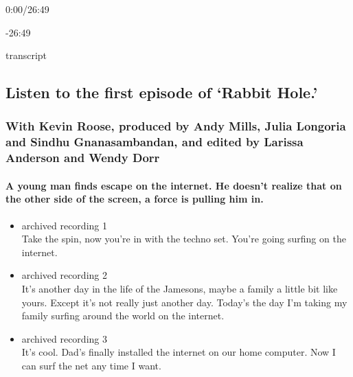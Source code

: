 0:00/26:49

-26:49

transcript

\hypertarget{listen-to-the-first-episode-of-rabbit-hole-1}{%
\subsection{Listen to the first episode of `Rabbit
Hole.'}\label{listen-to-the-first-episode-of-rabbit-hole-1}}

\hypertarget{with-kevin-roose-produced-by-andy-mills-julia-longoria-and-sindhu-gnanasambandan-and-edited-by-larissa-anderson-and-wendy-dorr}{%
\subsubsection{With Kevin Roose, produced by Andy Mills, Julia Longoria
and Sindhu Gnanasambandan, and edited by Larissa Anderson and Wendy
Dorr}\label{with-kevin-roose-produced-by-andy-mills-julia-longoria-and-sindhu-gnanasambandan-and-edited-by-larissa-anderson-and-wendy-dorr}}

\hypertarget{a-young-man-finds-escape-on-the-internet-he-doesnt-realize-that-on-the-other-side-of-the-screen-a-force-is-pulling-him-in}{%
\paragraph{A young man finds escape on the internet. He doesn't realize
that on the other side of the screen, a force is pulling him
in.}\label{a-young-man-finds-escape-on-the-internet-he-doesnt-realize-that-on-the-other-side-of-the-screen-a-force-is-pulling-him-in}}

\begin{itemize}
\item
  archived recording 1\\
  Take the spin, now you're in with the techno set. You're going surfing
  on the internet.
\item
  archived recording 2\\
  It's another day in the life of the Jamesons, maybe a family a little
  bit like yours. Except it's not really just another day. Today's the
  day I'm taking my family surfing around the world on the internet.
\item
  archived recording 3\\
  It's cool. Dad's finally installed the internet on our home computer.
  Now I can surf the net any time I want.
\end{itemize}

